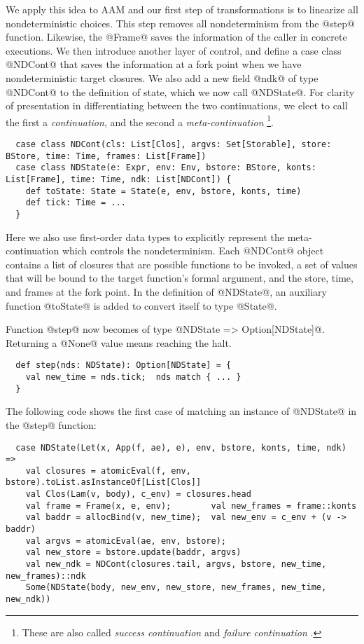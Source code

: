 \documentclass[acmsmall, review]{acmart}\settopmatter{}
\begin{document}
We apply this idea to AAM and our first step of transformations is to linearize all
nondeterministic choices. This step removes all nondeterminism from the @step@ function.
Likewise, the @Frame@ saves the information of the caller in concrete executions.
We then introduce another layer of control, and define a case class @NDCont@
that saves the information at a fork point when we have nondeterministic target closures.
We also add a new field @ndk@ of type @NDCont@ to the definition of state, which we now 
call @NDState@. For clarity of presentation in differentiating between the two continuations, 
we elect to call the first a \emph{continuation}, and the second a \emph{meta-continuation}
\footnote{These are also called \emph{success continuation} and \emph{failure
continuation} \cite{Danvy:1990:AC:91556.91622}.}.

\begin{lstlisting}
  case class NDCont(cls: List[Clos], argvs: Set[Storable], store: BStore, time: Time, frames: List[Frame])
  case class NDState(e: Expr, env: Env, bstore: BStore, konts: List[Frame], time: Time, ndk: List[NDCont]) {
    def toState: State = State(e, env, bstore, konts, time)
    def tick: Time = ...
  }
\end{lstlisting}

Here we also use first-order data types to explicitly represent the meta-continuation which
controls the nondeterminism.
Each @NDCont@ object contains a list of closures that are possible functions to be invoked,
a set of values that will be bound to the target function's formal argument, and the store, time,
and frames at the fork point. In the definition of @NDState@, an auxiliary function @toState@
is added to convert itself to type @State@.

Function @step@ now becomes of type @NDState => Option[NDState]@. Returning a @None@ value means
reaching the halt.

\begin{lstlisting}
  def step(nds: NDState): Option[NDState] = {
    val new_time = nds.tick;  nds match { ... }
  }
\end{lstlisting}

The following code shows the first case of matching an instance of @NDState@ in
the @step@ function:

\begin{lstlisting}
  case NDState(Let(x, App(f, ae), e), env, bstore, konts, time, ndk) =>
    val closures = atomicEval(f, env, bstore).toList.asInstanceOf[List[Clos]]
    val Clos(Lam(v, body), c_env) = closures.head
    val frame = Frame(x, e, env);        val new_frames = frame::konts
    val baddr = allocBind(v, new_time);  val new_env = c_env + (v -> baddr)
    val argvs = atomicEval(ae, env, bstore); 
    val new_store = bstore.update(baddr, argvs)
    val new_ndk = NDCont(closures.tail, argvs, bstore, new_time, new_frames)::ndk
    Some(NDState(body, new_env, new_store, new_frames, new_time, new_ndk))
\end{lstlisting}
\end{document}
